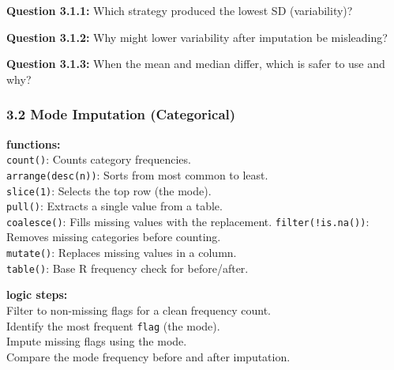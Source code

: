 \documentclass[
]{article}
\newenvironment{Shaded}{\begin{snugshade}}{\end{snugshade}}
\newcommand{\AttributeTok}[1]{\textcolor[rgb]{0.77,0.63,0.00}{#1}}
\newcommand{\CommentTok}[1]{\textcolor[rgb]{0.56,0.35,0.01}{\textit{#1}}}
\newcommand{\DecValTok}[1]{\textcolor[rgb]{0.00,0.00,0.81}{#1}}
\newcommand{\FunctionTok}[1]{\textcolor[rgb]{0.00,0.00,0.00}{#1}}
\newcommand{\NormalTok}[1]{#1}
\newcommand{\OtherTok}[1]{\textcolor[rgb]{0.56,0.35,0.01}{#1}}
\newcommand{\SpecialCharTok}[1]{\textcolor[rgb]{0.00,0.00,0.00}{#1}}
\begin{document}
\textbf{Question 3.1.1:} Which strategy produced the lowest SD
(variability)?

\textbf{Question 3.1.2:} Why might lower variability after imputation be
misleading?

\textbf{Question 3.1.3:} When the mean and median differ, which is safer
to use and why?

\hypertarget{mode-imputation-categorical}{%
\subsubsection{3.2 Mode Imputation
(Categorical)}\label{mode-imputation-categorical}}

\textbf{functions:}\\
\texttt{count()}: Counts category frequencies.\\
\texttt{arrange(desc(n))}: Sorts from most common to least.\\
\texttt{slice(1)}: Selects the top row (the mode).\\
\texttt{pull()}: Extracts a single value from a table.\\
\texttt{coalesce()}: Fills missing values with the replacement.
\texttt{filter(!is.na())}: Removes missing categories before counting.\\
\texttt{mutate()}: Replaces missing values in a column.\\
\texttt{table()}: Base R frequency check for before/after.

\textbf{logic steps:}\\
Filter to non-missing flags for a clean frequency count.\\
Identify the most frequent \texttt{flag} (the mode).\\
Impute missing flags using the mode.\\
Compare the mode frequency before and after imputation.

\begin{Shaded}
\end{Shaded}
\end{document}
